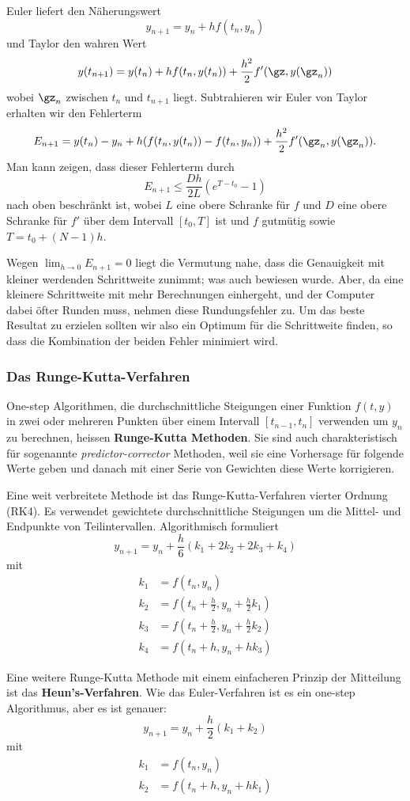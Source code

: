 \documentclass[%
draft,
11pt,%
twoside,%
titlepage,%
german,%
headsepline%
]{scrartcl}
\begin{document}
Euler liefert den N\"aherungswert
$$y_{n+1}=y_n+hf(t_n,y_n)$$
und Taylor den wahren Wert
$$y(t_{n+1})=y(t_n)+hf(t_n,y(t_n))+\frac{h^2}{2}f'(\gz,y(\gz_n))$$
wobei $\gz_n$ zwischen $t_n$ und $t_{n+1}$ liegt. Subtrahieren wir Euler von Taylor erhalten wir den Fehlerterm
$$
E_{n+1}=y(t_n)-y_n+
h(f(t_n,y(t_n))-f(t_n,y_n))+\frac{h^2}{2}f'(\gz_n,y(\gz_n)).
$$
Man kann zeigen, dass dieser Fehlerterm durch
$$E_{n+1}\leq \frac{Dh}{2L}(e^{T-t_0}-1)$$
nach oben beschr\"ankt ist, wobei $L$ eine obere Schranke f\"ur $f$ und $D$ eine obere Schranke f\"ur $f'$ \"uber dem Intervall $[t_0,T]$ ist und $f$ gutm\"utig sowie $T=t_0+(N-1)h$.

Wegen $\lim_{h\to0}E_{n+1}=0$ liegt die Vermutung nahe, dass die Genauigkeit mit kleiner werdenden Schrittweite zunimmt; was auch bewiesen wurde. Aber, da eine kleinere Schrittweite mit mehr Berechnungen einhergeht, und der Computer dabei \"ofter Runden muss, nehmen diese Rundungsfehler zu. Um das beste Resultat zu erzielen sollten wir also ein Optimum f\"ur die Schrittweite finden, so dass die Kombination der beiden Fehler minimiert wird.

\subsubsection{Das Runge-Kutta-Verfahren}

One-step Algorithmen, die durchschnittliche Steigungen einer Funktion $f(t,y)$ in zwei oder mehreren Punkten \"uber einem Intervall $[t_{n-1},t_n]$ verwenden um $y_n$ zu berechnen, heissen \textbf{Runge-Kutta Methoden}. Sie sind auch charakteristisch f\"ur sogenannte \emph{predictor-corrector} Methoden, weil sie eine Vorhersage f\"ur folgende Werte geben und danach mit einer Serie von Gewichten diese Werte korrigieren.

Eine weit verbreitete Methode ist das Runge-Kutta-Verfahren vierter Ordnung (RK4). Es verwendet gewichtete durchschnittliche Steigungen um die Mittel- und Endpunkte von Teilintervallen. Algorithmisch formuliert
$$y_{n+1}=y_n+\frac{h}{6}(k_1+2k_2+2k_3+k_4)$$
mit
\begin{align*}
k_1 &= f(t_n,y_n)\\
k_2 &= f(t_n+\frac{h}{2},y_n+\frac{h}{2}k_1)\\
k_3 &= f(t_n+\frac{h}{2},y_n+\frac{h}{2}k_2)\\
k_4 &= f(t_n+h,y_n+hk_3)
\end{align*}

Eine weitere Runge-Kutta Methode mit einem einfacheren Prinzip der Mitteilung ist das \textbf{Heun's-Verfahren}. Wie das Euler-Verfahren ist es ein one-step Algorithmus, aber es ist genauer:
$$y_{n+1}=y_n+\frac{h}{2}(k_1+k_2)$$
mit
\begin{align*}
k_1 &= f(t_n,y_n)\\
k_2 &= f(t_n+h,y_n+hk_1)
\end{align*}
\end{document}
